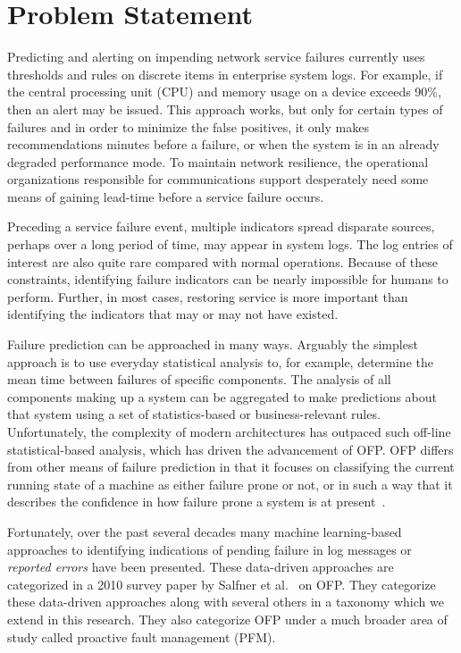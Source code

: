 \section{Problem Statement}
Predicting and alerting on impending network service failures currently uses
thresholds and rules on discrete items in enterprise system logs.  For example,
if the central processing unit (CPU) and memory usage on a device exceeds 90\%,
then an alert may be issued.  This approach works, but only for certain types
of failures and in order to minimize the false positives, it only makes
recommendations minutes before a failure, or when the system is in an already
degraded performance mode.  To maintain network resilience, the operational
organizations responsible for communications support desperately need some
means of gaining lead-time before a service failure occurs.  

Preceding a service failure event, multiple indicators spread disparate
sources, perhaps over a long period of time, may appear in system logs.  The
log entries of interest are also quite rare compared with normal operations.
Because of these constraints, identifying failure indicators can be nearly
impossible for humans to perform.  Further, in most cases, restoring service is
more important than identifying the indicators that may or may not have
existed.  

Failure prediction can be approached in many ways. Arguably the simplest
approach is to use everyday statistical analysis to, for example, determine the
mean time between failures of specific components. The analysis of all
components making up a system can be aggregated to make predictions about that
system using a set of statistics-based or business-relevant rules.
Unfortunately, the complexity of modern architectures has outpaced such
off-line statistical-based analysis, which has driven the advancement of OFP.
OFP differs from other means of failure prediction in that it focuses on
classifying the current running state of a machine as either failure prone or
not, or in such a way that it describes the confidence in how failure prone a
system is at present~\cite{salfnerSurvey}.

Fortunately, over the past several decades many machine learning-based
approaches to identifying indications of pending failure in log messages or
\emph{reported errors} have been presented.  These data-driven approaches are
categorized in a 2010 survey paper by Salfner et al.~\cite{salfnerSurvey} on
OFP.  They categorize these data-driven approaches along with several others in
a taxonomy which we extend in this research.  They also categorize OFP under a
much broader area of study called proactive fault management (PFM).


